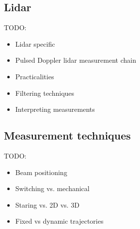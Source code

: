 \clearpage
\subsection{Lidar}
\label{sec:intro_lidar}

TODO:
\begin{itemize}
\color{red}
    \item Lidar specific 
    \item Pulsed Doppler lidar measurement chain
    \item Practicalities
    \item Filtering techniques
    \item Interpreting measurements
\end{itemize}


\clearpage
\subsection{Measurement techniques}
\label{sec:intro_meas_tech}

TODO:
\begin{itemize}
\color{red}
    \item Beam positioning
    \item Switching vs. mechanical
    \item Staring vs. 2D vs. 3D
    \item Fixed vs dynamic trajectories
\end{itemize}



\clearpage